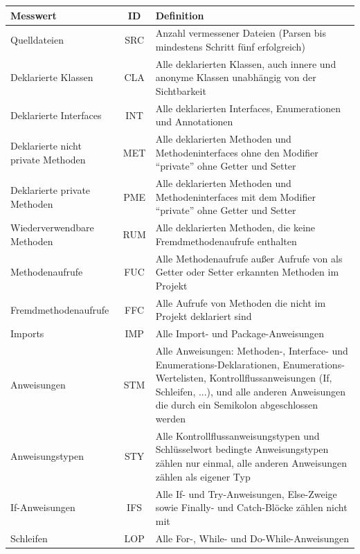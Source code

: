 \documentclass[gb,ngerman]{stthesis}
\begin{document}
			\begin{center}
				\tabulinesep=1.5mm
				\begin{longtabu}{|p{0.25\textwidth}|c|p{0.6\textwidth}|}
					\hline
  					\textbf{Messwert} & \textbf{ID} & \textbf{Definition} \\
  					\hline
    				Quelldateien & SRC & Anzahl vermessener Dateien (Parsen bis mindestens Schritt fünf erfolgreich)\\
    				\hline
    				Deklarierte Klassen & CLA & Alle deklarierten Klassen, auch innere und anonyme Klassen unabhängig von der Sichtbarkeit \\
    				\hline
    				Deklarierte Interfaces & INT & Alle deklarierten Interfaces, Enumerationen und Annotationen \\
    				\hline
    				Deklarierte nicht private Methoden & MET & Alle deklarierten Methoden und Methodeninterfaces ohne den Modifier "`private"' ohne Getter und Setter \\
    				\hline
    				Deklarierte private Methoden & PME & Alle deklarierten Methoden und Methodeninterfaces mit dem Modifier "`private"' ohne Getter und Setter \\ 
    				\hline
    				Wiederverwendbare Methoden & RUM & Alle deklarierten Methoden, die keine Fremdmethodenaufrufe enthalten \\
    				\hline
    				Methodenaufrufe & FUC & Alle Methodenaufrufe außer Aufrufe von als Getter oder Setter erkannten Methoden im Projekt \\
    				\hline
    				Fremdmethodenaufrufe & FFC & Alle Aufrufe von Methoden die nicht im Projekt deklariert sind \\
    				\hline
    				Imports & IMP & Alle Import- und Package-Anweisungen \\
    				\hline
    				Anweisungen & STM & Alle Anweisungen: Methoden-, Interface- und Enumerations-Deklarationen, Enumerations-Wertelisten, Kontrollflussanweisungen (If, Schleifen, ...), und alle anderen Anweisungen die durch ein Semikolon abgeschlossen werden \\
    				\hline
    				Anweisungstypen & STY & Alle Kontrollflussanweisungstypen und Schlüsselwort bedingte Anweisungstypen zählen nur einmal, alle anderen Anweisungen zählen als eigener Typ \\
    				\hline
    				If-Anweisungen & IFS & Alle If- und Try-Anweisungen, Else-Zweige sowie Finally- und Catch-Blöcke zählen nicht mit \\
    				\hline
    				Schleifen & LOP & Alle For-, While- und Do-While-Anweisungen \\

\end{longtabu}
\end{center}
\end{document}
